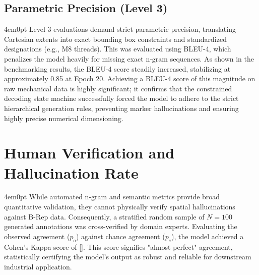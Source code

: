 \subsection{Parametric Precision (Level 3)}
\begin{indentedblock}{4em}{0pt}
	Level 3 evaluations demand strict parametric precision, translating Cartesian extents into exact bounding box constraints and standardized designations (e.g., M8 threads). This was evaluated using BLEU-4, which penalizes the model heavily for missing exact n-gram sequences. As shown in the benchmarking results, the BLEU-4 score steadily increased, stabilizing at approximately 0.85 at Epoch 20. Achieving a BLEU-4 score of this magnitude on raw mechanical data is highly significant; it confirms that the constrained decoding state machine successfully forced the model to adhere to the strict hierarchical generation rules, preventing marker hallucinations and ensuring highly precise numerical dimensioning.
\end{indentedblock}

\section{Human Verification and Hallucination Rate}
\begin{indentedblock}{4em}{0pt}
	While automated n-gram and semantic metrics provide broad quantitative validation, they cannot physically verify spatial hallucinations against B-Rep data. Consequently, a stratified random sample of $N=100$ generated annotations was cross-verified by domain experts. Evaluating the observed agreement ($p_o$) against chance agreement ($p_e$), the model achieved a Cohen's Kappa score of []. This score signifies "almost perfect" agreement, statistically certifying the model's output as robust and reliable for downstream industrial application.
\end{indentedblock}

\endgroup